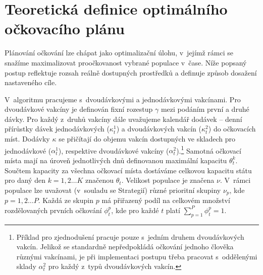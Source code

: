 \section*{Teoretická definice optimálního očkovacího plánu} 
\label{sec_vypocet}

Plánování očkování lze chápat jako optimalizační úlohu, v~jejímž rámci se snažíme maximalizovat proočkovanost vybrané populace v~čase. Níže popsaný postup reflektuje rozsah reálně dostupných prostředků a definuje způsob dosažení nastaveného cíle.


V~algoritmu pracujeme s~dvoudávkovými a jednodávkovými vakcínami. Pro dvou\-dáv\-ko\-vé vakcíny je definován fixní rozestup $\gamma$ mezi podáním první a druhé dávky. Pro každý z~druhů vakcíny dále uvažujeme kalendář dodávek -- denní přírůstky dávek jednodávkových ($\kappa_{t}^{1}$) a dvoudávkových vakcín ($\kappa_{t}^{2}$) do očkovacích míst. Dodávky $\kappa$ se přičítají do objemu vakcín dostupných ve skladech pro jednodávkové ($\alpha_{t}^{1}$), respektive dvoudávkové vakcíny ($\alpha_{t}^{2}$).\footnote{Příklad pro zjednodušení pracuje pouze s~jedním druhem dvoudávkových vakcín. Jelikož se standardně nepředpokládá očkování jednoho člověka různými vakcínami, je při implementaci postupu třeba pracovat s~oddělenými sklady $\alpha_{t}^{2}$ pro každý z~typů dvoudávkových vakcín.} 
Samotná očkovací místa mají na úroveň jednotlivých dnů definovanou maximální kapacitu $\theta_{t}^{k}$. Součtem kapacity za všechna očkovací místa dostáváme celkovou kapacitu státu pro daný den $k=1,2 \dots K$ značenou $\theta_{t}$.
%
Velikost populace je značena $\nu$. V~rámci populace lze uvažovat (v~souladu se Strategií) různé prioritní skupiny $\nu_{p}$, kde $p=1,2\dots P$. Každá ze skupin $p$ má přiřazený podíl na celkovém množství rozdělovaných prvních očkování $\phi_{t}^{p}$, kde pro každé $t$ platí $\sum_{p=1}^{P}\phi_{t}^{p}=1$. 

